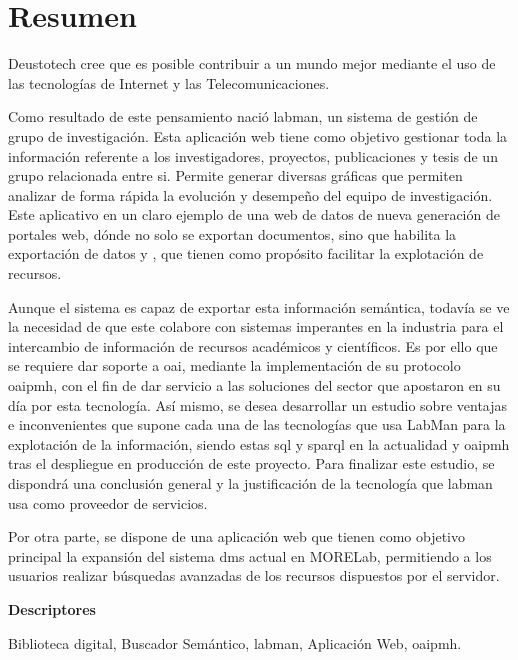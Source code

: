 \chapter*{Resumen}

Deustotech cree que es posible contribuir a un mundo mejor mediante el uso de
las tecnologías de Internet y las Telecomunicaciones.

Como resultado de este pensamiento nació \acrshort{labman}, un sistema de gestión de grupo de investigación. Esta aplicación web tiene como objetivo gestionar toda la información referente a los investigadores, proyectos, publicaciones y tesis de un grupo relacionada entre si. Permite 
generar diversas gráficas que permiten analizar de forma rápida la evolución y desempeño del equipo
de investigación.
Este aplicativo en un claro ejemplo de una web de datos de nueva generación de portales web, dónde
no solo se exportan documentos, sino que habilita la exportación de datos y , que
tienen como propósito facilitar la explotación de recursos.

Aunque el sistema es capaz de exportar esta información semántica, todavía se ve la necesidad de que este colabore con sistemas imperantes en la industria para el intercambio de información de recursos académicos y científicos.
Es por ello que se requiere dar soporte a \acrshort{oai}, mediante la implementación de su protocolo \acrshort{oaipmh}, con el fin de dar servicio a las soluciones del sector que apostaron en su día por esta tecnología. Así mismo, se desea desarrollar un estudio sobre ventajas e inconvenientes que supone cada una de las tecnologías que usa LabMan para la explotación de la información, siendo estas \acrshort{sql} y \acrshort{sparql} en la actualidad y \acrshort{oaipmh} tras el despliegue en producción de este proyecto. Para finalizar este estudio, se dispondrá una conclusión general y la justificación de la tecnología que \acrshort{labman} usa como proveedor de servicios.

Por otra parte, se dispone de una aplicación web que tienen como objetivo principal la expansión
del sistema \acrshort{dms} actual en MORELab, permitiendo a los usuarios realizar búsquedas avanzadas de los recursos dispuestos por el servidor.

\vspace{2em}

{\Large\bfseries\sffamily Descriptores}
\vspace{3\medskipamount}

Biblioteca digital, Buscador Semántico, \acrshort{labman}, Aplicación Web, \acrshort{oaipmh}.